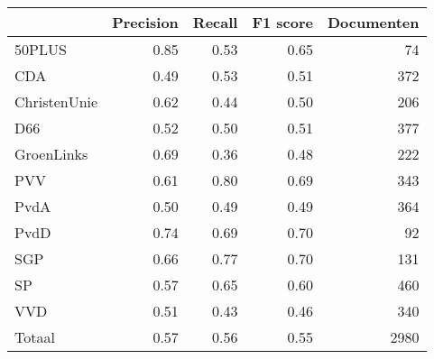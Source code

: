 \begin{tabular}{lrrrr}
\toprule
{} &  Precision &  Recall &  F1 score &  Documenten \\
\midrule
50PLUS       &       0.85 &    0.53 &      0.65 &          74 \\
CDA          &       0.49 &    0.53 &      0.51 &         372 \\
ChristenUnie &       0.62 &    0.44 &      0.50 &         206 \\
D66          &       0.52 &    0.50 &      0.51 &         377 \\
GroenLinks   &       0.69 &    0.36 &      0.48 &         222 \\
PVV          &       0.61 &    0.80 &      0.69 &         343 \\
PvdA         &       0.50 &    0.49 &      0.49 &         364 \\
PvdD         &       0.74 &    0.69 &      0.70 &          92 \\
SGP          &       0.66 &    0.77 &      0.70 &         131 \\
SP           &       0.57 &    0.65 &      0.60 &         460 \\
VVD          &       0.51 &    0.43 &      0.46 &         340 \\
Totaal       &       0.57 &    0.56 &      0.55 &        2980 \\
\bottomrule
\end{tabular}
